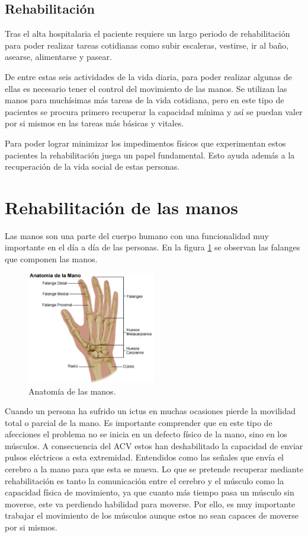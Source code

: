 \subsection{Rehabilitación}
\label{sec:neuronal2}

Tras el alta hospitalaria el paciente requiere un largo periodo de rehabilitación para poder realizar tareas cotidianas como subir escaleras, vestirse, ir al baño, asearse, alimentarse y pasear. \cite{secuelasIctus}

De entre estas seis actividades de la vida diaria, para poder realizar algunas de ellas es necesario tener el control del movimiento de las manos. Se utilizan las manos para muchísimas más tareas de la vida cotidiana, pero en este tipo de pacientes se procura primero recuperar la capacidad mínima y así se puedan valer por si mismos en las tareas más básicas y vitales.

Para poder lograr minimizar los impedimentos físicos que experimentan estos pacientes la rehabilitación juega un papel fundamental. Esto ayuda además a la recuperación de la vida social de estas personas. 


\section{Rehabilitación de las manos}
\label{sec:fuindamentos2}

Las manos son una parte del cuerpo humano con una funcionalidad muy importante en el día a día de las personas. En la figura \ref{fig:anatomiaMano} se observan las falanges que componen las manos. 

\begin{figure}[H]
	\centering
	\includegraphics[width=0.5\textwidth]{./img/anatomiaMano}
	\caption{Anatomía de las manos.  \cite{imgAnatomiaMano}}
	\label{fig:anatomiaMano}
\end{figure} 

Cuando un persona ha sufrido un ictus en muchas ocasiones pierde la movilidad total o parcial de la mano. Es importante comprender que en este tipo de afecciones el problema no se inicia en un defecto físico de la mano, sino en los músculos. A consecuencia del ACV estos han deshabilitado la capacidad de enviar pulsos eléctricos a esta extremidad. Entendidos como las señales que envía el cerebro a la mano para que esta se mueva. Lo que se pretende recuperar mediante rehabilitación es tanto la comunicación entre el cerebro y el músculo como la capacidad física de movimiento, ya que cuanto más tiempo pasa un músculo sin moverse, este va perdiendo habilidad para moverse. Por ello, es muy importante trabajar el movimiento de los músculos aunque estos no sean capaces de moverse por si mismos.


